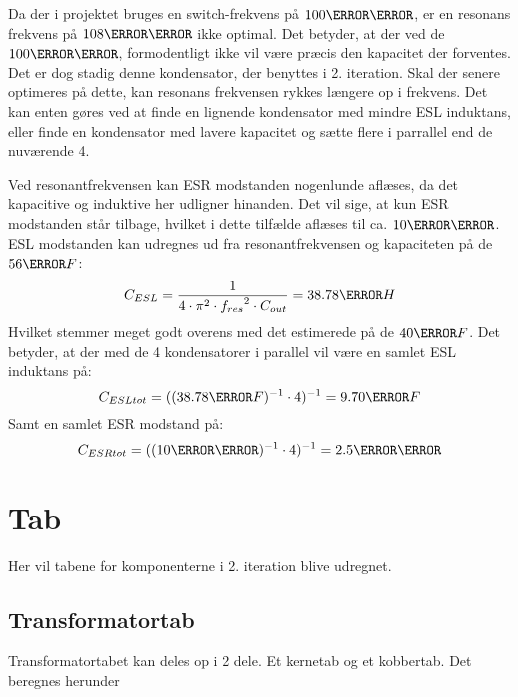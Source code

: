 Da der i projektet bruges en switch-frekvens på $100\kilo \hertz$, er en resonans frekvens på $108\kilo \hertz$ ikke optimal. Det betyder, at der ved de $100\kilo \hertz$, formodentligt ikke vil være præcis den kapacitet der forventes. Det er dog stadig denne kondensator, der benyttes i 2. iteration. Skal der senere optimeres på dette, kan resonans frekvensen rykkes længere op i frekvens. Det kan enten gøres ved at finde en lignende kondensator med mindre ESL induktans, eller finde en kondensator med lavere kapacitet og sætte flere i parrallel end de nuværende 4.


\noindent Ved resonantfrekvensen kan ESR modstanden nogenlunde aflæses, da det kapacitive og induktive her udligner hinanden. Det vil sige, at kun ESR modstanden står tilbage, hvilket i dette tilfælde aflæses til ca. $10\milli \ohm$. 
ESL modstanden kan udregnes ud fra resonantfrekvensen og kapaciteten på de $56\micro F$:
\begin{equation} \label{CESL}
C_{ESL} = \frac{1}{4 \cdot \pi^{2} \cdot {f_{res}}^{2} \cdot C_{out}} = 38.78\nano H
\end{equation}
Hvilket stemmer meget godt overens med det estimerede på de $40\nano F$.
Det betyder, at der med de 4 kondensatorer i parallel vil være en samlet ESL induktans på: 
\begin{equation} \label{CESLtot}
C_{ESLtot} = ((38.78\nano F)^{-1} \cdot 4)^{-1} = 9.70\nano F
\end{equation}
Samt en samlet ESR modstand på:
\begin{equation} \label{CSRtot}
C_{ESRtot} = ((10\milli \ohm)^{-1} \cdot 4)^{-1} = 2.5\milli \ohm
\end{equation}



\section{Tab}
Her vil tabene for komponenterne i 2. iteration blive udregnet. 

\subsection{Transformatortab}
Transformatortabet kan deles op i 2 dele. Et kernetab og et kobbertab. Det beregnes herunder


